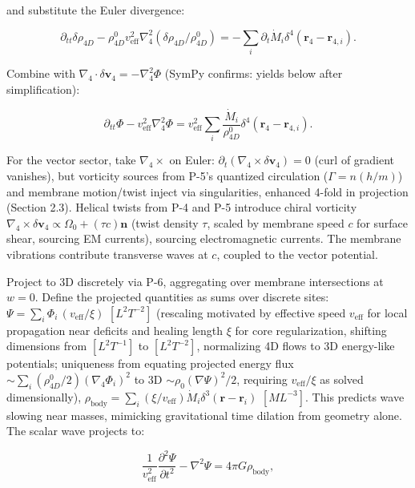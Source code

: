 and substitute the Euler divergence:

\begin{equation}
\partial_{tt} \delta \rho_{4D} - \rho_{4D}^0 v_{\text{eff}}^2 \nabla_4^2 (\delta \rho_{4D} / \rho_{4D}^0) = -\sum_i \partial_t \dot{M}_i \delta^4(\mathbf{r}_4 - \mathbf{r}_{4,i}).
\end{equation}

Combine with $\nabla_4 \cdot \delta \mathbf{v}_4 = -\nabla_4^2 \Phi$ (SymPy confirms: yields below after simplification):

\begin{equation}
\partial_{tt} \Phi - v_{\text{eff}}^2 \nabla_4^2 \Phi = v_{\text{eff}}^2 \sum_i \frac{\dot{M}_i}{\rho_{4D}^0} \delta^4(\mathbf{r}_4 - \mathbf{r}_{4,i}).
\end{equation}

For the vector sector, take $\nabla_4 \times$ on Euler: $\partial_t (\nabla_4 \times \delta \mathbf{v}_4) = 0$ (curl of gradient vanishes), but vorticity sources from P-5's quantized circulation ($\Gamma = n (h/m)$) and membrane motion/twist inject via singularities, enhanced 4-fold in projection (Section 2.3). Helical twists from P-4 and P-5 introduce chiral vorticity $\nabla_4 \times \delta \mathbf{v}_4 \propto \Omega_0 + (\tau c) \mathbf{n}$ (twist density $\tau$, scaled by membrane speed $c$ for surface shear, sourcing EM currents), sourcing electromagnetic currents. The membrane vibrations contribute transverse waves at $c$, coupled to the vector potential.

Project to 3D discretely via P-6, aggregating over membrane intersections at $w=0$. Define the projected quantities as sums over discrete sites: $\Psi = \sum_i \Phi_i \, (v_{\text{eff}} / \xi)$ $[L^2 T^{-2}]$ (rescaling motivated by effective speed $v_{\text{eff}}$ for local propagation near deficits and healing length $\xi$ for core regularization, shifting dimensions from $[L^2 T^{-1}]$ to $[L^2 T^{-2}]$, normalizing 4D flows to 3D energy-like potentials; uniqueness from equating projected energy flux $\sim \sum_i (\rho_{4D}^0 / 2) (\nabla_4 \Phi_i)^2$ to 3D $\sim \rho_0 (\nabla \Psi)^2 / 2$, requiring $v_{\text{eff}} / \xi$ as solved dimensionally), $\rho_{\text{body}} = \sum_i \left( \xi / v_{\text{eff}} \right) \dot{M}_i \delta^3(\mathbf{r} - \mathbf{r}_i)$ $[M L^{-3}]$. This predicts wave slowing near masses, mimicking gravitational time dilation from geometry alone. The scalar wave projects to:

\begin{equation}
\frac{1}{v_{\text{eff}}^2} \frac{\partial^2 \Psi}{\partial t^2} - \nabla^2 \Psi = 4\pi G \rho_{\text{body}},
\end{equation}

